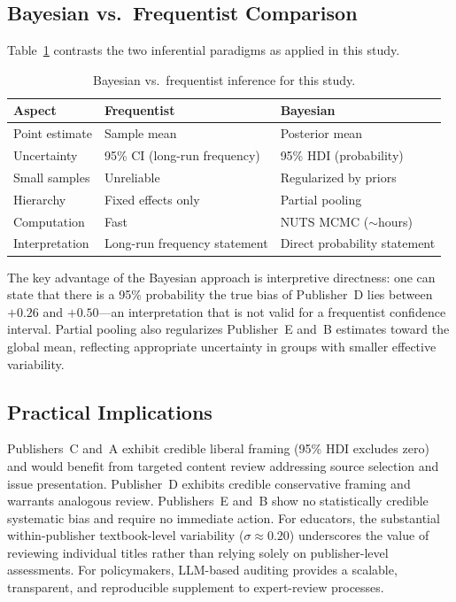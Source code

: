\documentclass[10pt,letterpaper]{article}
\begin{document}
\subsection{Bayesian vs.\ Frequentist Comparison}

Table~\ref{tab:bayes_vs_freq} contrasts the two inferential paradigms as applied
in this study.

\begin{table}[h]
\centering
\caption{Bayesian vs.\ frequentist inference for this study.}
\label{tab:bayes_vs_freq}
\begin{tabular}{lll}
\toprule
\textbf{Aspect} & \textbf{Frequentist} & \textbf{Bayesian} \\
\midrule
Point estimate   & Sample mean                       & Posterior mean \\
Uncertainty      & 95\% CI (long-run frequency)      & 95\% HDI (probability) \\
Small samples    & Unreliable                        & Regularized by priors \\
Hierarchy        & Fixed effects only                & Partial pooling \\
Computation      & Fast                              & NUTS MCMC ($\sim$hours) \\
Interpretation   & Long-run frequency statement      & Direct probability statement \\
\bottomrule
\end{tabular}
\end{table}

The key advantage of the Bayesian approach is interpretive directness: one can
state that there is a 95\% probability the true bias of Publisher~D lies between
$+0.26$ and $+0.50$---an interpretation that is not valid for a frequentist
confidence interval.  Partial pooling also regularizes Publisher~E and~B estimates
toward the global mean, reflecting appropriate uncertainty in groups with smaller
effective variability.

\subsection{Practical Implications}

Publishers~C and~A exhibit credible liberal framing (95\% HDI excludes zero) and
would benefit from targeted content review addressing source selection and issue
presentation.  Publisher~D exhibits credible conservative framing and warrants
analogous review.  Publishers~E and~B show no statistically credible systematic
bias and require no immediate action.  For educators, the substantial
within-publisher textbook-level variability ($\sigma \approx 0.20$) underscores
the value of reviewing individual titles rather than relying solely on
publisher-level assessments.  For policymakers, LLM-based auditing provides a
scalable, transparent, and reproducible supplement to expert-review processes.
\end{document}
